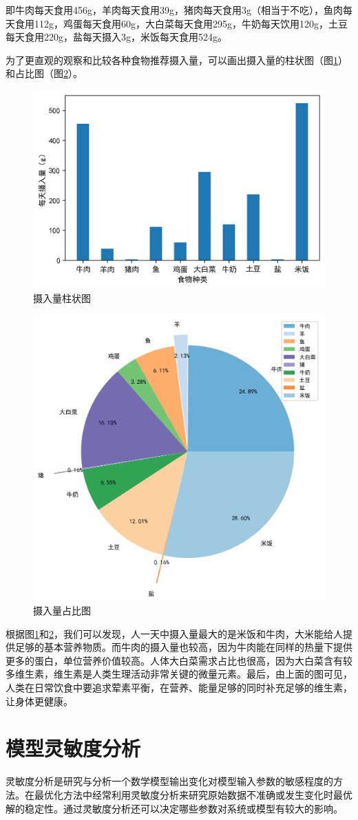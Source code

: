 \documentclass{SYSUReport}
\begin{document}
即牛肉每天食用456g，羊肉每天食用39g，猪肉每天食用3g（相当于不吃），鱼肉每天食用112g，鸡蛋每天食用60g，大白菜每天食用295g，牛奶每天饮用120g，土豆每天食用220g，盐每天摄入3g，米饭每天食用524g。

为了更直观的观察和比较各种食物推荐摄入量，可以画出摄入量的柱状图（图\ref{boxplot-fig}）和占比图（图\ref{pieplot-fig}）。
\begin{figure}[h]
	\centering
	\includegraphics[width=0.6\linewidth]{figures/fig2.png}
	\caption{摄入量柱状图}
	\label{boxplot-fig}
\end{figure}

\begin{figure}[h!]
	\centering
	\includegraphics[width=0.6\linewidth]{figures/fig3.png}
	\caption{摄入量占比图}
	\label{pieplot-fig}
\end{figure}
根据图\ref{boxplot-fig}和\ref{pieplot-fig}，我们可以发现，人一天中摄入量最大的是米饭和牛肉，大米能给人提供足够的基本营养物质。而牛肉的摄入量也较高，因为牛肉能在同样的热量下提供更多的蛋白，单位营养价值较高。人体大白菜需求占比也很高，因为大白菜含有较多维生素，维生素是人类生理活动非常关键的微量元素。最后，由上面的图可见，人类在日常饮食中要追求荤素平衡，在营养、能量足够的同时补充足够的维生素，让身体更健康。

\section{模型灵敏度分析}
灵敏度分析是研究与分析一个数学模型输出变化对模型输入参数的敏感程度的方法。在最优化方法中经常利用灵敏度分析来研究原始数据不准确或发生变化时最优解的稳定性。通过灵敏度分析还可以决定哪些参数对系统或模型有较大的影响。
\end{document}
